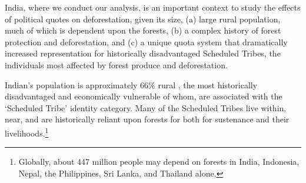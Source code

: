 \documentclass[12pt,reqno]{article}
\begin{document}



India, where we conduct our analysis, is an important context to study the effects of political quotes on deforestation, given its size,  (a) large rural population, much of which is dependent upon the forests, (b) a complex history of forest protection and deforestation, and (c) a unique quota system that dramatically increased representation for historically disadvantaged Scheduled Tribes, the individuals most affected by forest produce and deforestation. 


Indian's population is approximately $66$\% rural \parencite{world_bank}, the most historically disadvantaged and economically vulnerable of whom, are associated with the `Scheduled Tribe' identity category. Many of the Scheduled Tribes live within, near, and are historically reliant upon forests for both for sustenance and their livelihoods.\footnote{Globally, about 447 million people may depend on forests in India, Indonesia, Nepal, the Philippines, Sri Lanka, and Thailand alone\parencite{lynch1995balancing}.}

\end{document}

